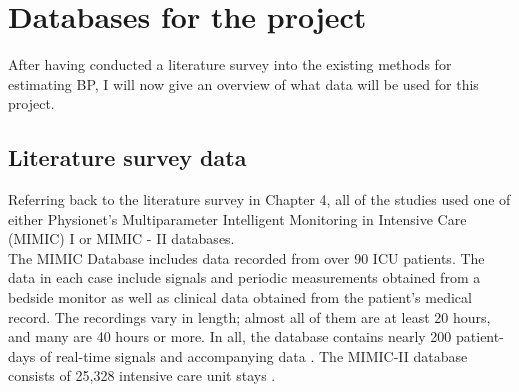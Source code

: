 \documentclass[11pt, a4paper]{article}
\begin{document}
\newpage

\section{Databases for the project}
After having conducted a literature survey into the existing methods for estimating BP, I will now give an overview of what data will be used for this project.
\subsection{Literature survey data}
Referring back to the literature survey in Chapter 4, all of the studies used one of either Physionet's Multiparameter Intelligent Monitoring  in  Intensive  Care  (MIMIC) I  or MIMIC - II databases. \\ \newline \noindent The MIMIC Database includes data recorded from over 90 ICU patients. The data in each case include signals and periodic measurements obtained from a bedside monitor as well as clinical data obtained from the patient's medical record. The recordings vary in length; almost all of them are at least 20 hours, and many are 40 hours or more. In all, the database contains nearly 200 patient-days of real-time signals and accompanying data \cite{Moody1996}. The MIMIC-II database consists of 25,328 intensive care unit stays \cite{Saeed2011}.
\end{document}
